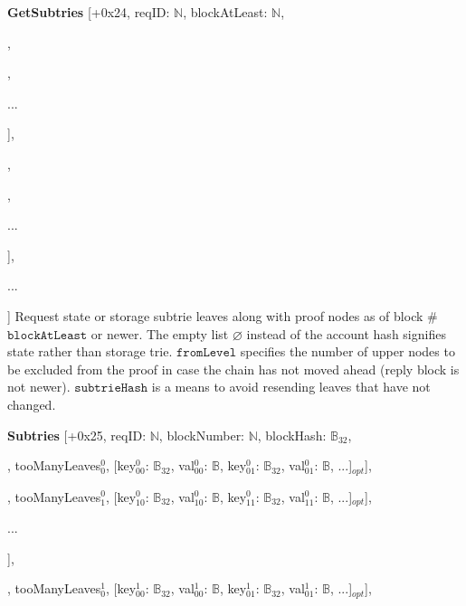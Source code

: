 \documentclass{amsart}
\begin{document}
\textbf{GetSubtries} [+0x24, reqID: $\mathbb{N}$, blockAtLeast: $\mathbb{N}$,

\quad [account$^0$: $\mathbb{B}_{32} | \varnothing$,

\qquad [prefix$^0_0$: $\mathbb{Y}$, fromLevel$^0_0$: $\mathbb{N}$, subtrieHash$^0_0$: $\mathbb{B}_{32}| \varnothing$],

,

\qquad ...

\quad ],

\quad [account$^1$: $\mathbb{B}_{32} | \varnothing$,

\qquad [prefix$^1_0$: $\mathbb{Y}$, fromLevel$^1_0$: $\mathbb{N}$, subtrieHash$^1_0$: $\mathbb{B}_{32}| \varnothing$],

,

\qquad ...

\quad ],

\quad ...

] Request state or storage subtrie leaves along with proof nodes as of block \#$\texttt{blockAtLeast}$ or newer.
The empty list $\varnothing$ instead of the account hash signifies state rather than storage trie.
$\texttt{fromLevel}$ specifies the number of upper nodes to be excluded from the proof in case the chain has not moved ahead (reply block is not newer).
$\texttt{subtrieHash}$ is a means to avoid resending leaves that have not changed.

\textbf{Subtries} [+0x25, reqID: $\mathbb{N}$, blockNumber: $\mathbb{N}$, blockHash: $\mathbb{B}_{32}$,

\quad [

\qquad [[node$^0_{00}$: $\mathbb{B}$, node$^0_{01}$: $\mathbb{B}$, ...], tooManyLeaves$^0_0$, [key$^0_{00}$: $\mathbb{B}_{32}$, val$^0_{00}$: $\mathbb{B}$, key$^0_{01}$: $\mathbb{B}_{32}$, val$^0_{01}$: $\mathbb{B}$, ...]$_{opt}$],

\qquad [[node$^0_{10}$: $\mathbb{B}$, node$^0_{11}$: $\mathbb{B}$, ...], tooManyLeaves$^0_1$, [key$^0_{10}$: $\mathbb{B}_{32}$, val$^0_{10}$: $\mathbb{B}$, key$^0_{11}$: $\mathbb{B}_{32}$, val$^0_{11}$: $\mathbb{B}$, ...]$_{opt}$],

\qquad ...

\quad ],

\quad [

\qquad [[node$^1_{00}$: $\mathbb{B}$, node$^1_{01}$: $\mathbb{B}$, ...], tooManyLeaves$^1_0$, [key$^1_{00}$: $\mathbb{B}_{32}$, val$^1_{00}$: $\mathbb{B}$, key$^1_{01}$: $\mathbb{B}_{32}$, val$^1_{01}$: $\mathbb{B}$, ...]$_{opt}$],
\end{document}

